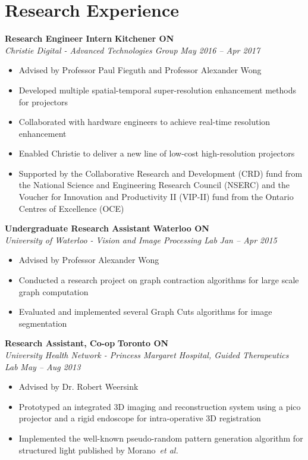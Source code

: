 \section*{Research Experience}
    \vspace{\postsubhead}
      \textbf{Research Engineer Intern}
      \hfill
      \textbf{Kitchener ON}\\
      \textit{Christie Digital - Advanced Technologies Group}
      \hfill
      \textit{May 2016 -- Apr 2017}
      \begin{itemize}
        \item Advised by Professor Paul Fieguth and Professor Alexander Wong
        \item Developed multiple spatial-temporal super-resolution enhancement methods for projectors
        \item Collaborated with hardware engineers to achieve real-time resolution enhancement 
        \item Enabled Christie to deliver a new line of low-cost high-resolution projectors
        \item Supported by the Collaborative Research and Development (CRD) fund from the National Science and Engineering Research Council (NSERC) and the Voucher for Innovation and Productivity II (VIP-II) fund from the Ontario Centres of Excellence (OCE)
      \end{itemize}
      \vspace{\interlist}
      \textbf{Undergraduate Research Assistant}
      \hfill
      \textbf{Waterloo ON}\\
      \textit{University of Waterloo - Vision and Image Processing Lab}
      \hfill
      \textit{Jan -- Apr 2015}
      \begin{itemize}
        \item Advised by Professor Alexander Wong
        \item Conducted a research project on graph contraction algorithms for large scale graph computation
        \item Evaluated and implemented several Graph Cuts algorithms for image segmentation
      \end{itemize}
      \vspace{\interlist}
      \textbf{Research Assistant, Co-op}
      \hfill
      \textbf{Toronto ON}\\
      \textit{University Health Network - Princess Margaret Hospital, Guided Therapeutics Lab}
      \hfill
      \textit{May -- Aug 2013}
      \begin{itemize}
        \item Advised by Dr. Robert Weersink
        \item Prototyped an integrated 3D imaging and reconstruction system using a pico projector and a rigid endoscope for intra-operative 3D registration
        \item Implemented the well-known pseudo-random pattern generation algorithm for structured light published by Morano~\textit{et al.}
      \end{itemize}
      \vspace{\interlist}

